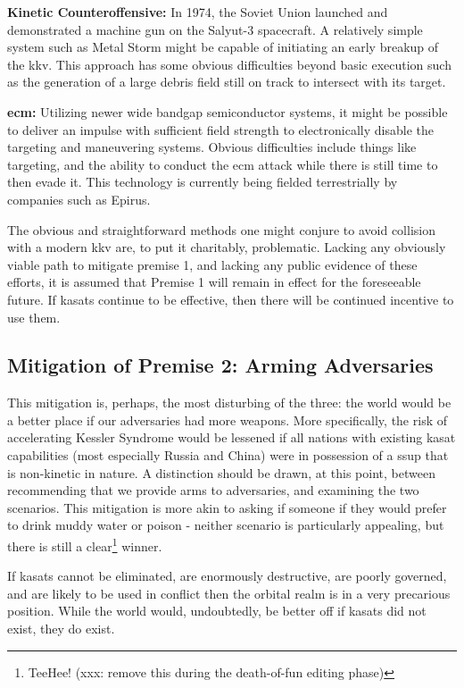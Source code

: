 \textbf{Kinetic Counteroffensive:} In 1974, the Soviet Union launched
and demonstrated a machine gun on the Salyut-3 spacecraft.\cite{xxx} A
relatively simple system such as Metal Storm might be capable of
initiating an early breakup of the \ac{kkv}.  This approach has some
obvious difficulties beyond basic execution such as the generation of
a large debris field still on track to intersect with its target.

\textbf{\acf{ecm}:} Utilizing newer wide bandgap semiconductor
systems, it might be possible to deliver an impulse with sufficient
field strength to electronically disable the  targeting and
maneuvering systems.  Obvious difficulties include things like
targeting, and the ability to conduct the \ac{ecm} attack while there
is still time to then evade it.  This technology is currently being
fielded terrestrially by companies such as Epirus.\cite{epirus}

The obvious and straightforward methods one might conjure to avoid
collision with a modern \ac{kkv} are, to put it charitably,
problematic.  Lacking any obviously viable path to mitigate premise 1,
and lacking any public evidence of these efforts, it is assumed that
Premise 1 will remain in effect for the foreseeable future.  If
\acp{kasat} continue to be effective, then there will be continued
incentive to use them.

\subsection{Mitigation of Premise 2: Arming Adversaries}
This mitigation is, perhaps, the most disturbing of the three: the
world would be a better place if our adversaries had more weapons.
More specifically, the risk of accelerating Kessler Syndrome would be
lessened if all nations with existing \ac{kasat} capabilities (most
especially Russia and China) were in possession of a \acf{ssup} that
is non-kinetic in nature.  A distinction should be drawn, at this
point, between recommending that we provide arms to adversaries, and
examining the two scenarios.  This mitigation is more akin to asking
if someone if they would prefer to drink muddy water or poison -
neither scenario is particularly appealing, but there is still a
clear\footnote{TeeHee! (xxx: remove this during the death-of-fun
editing phase)} winner.

If \acp{kasat} cannot be eliminated, are enormously destructive, are
poorly governed, and are likely to be used in conflict then the
orbital realm is in a very precarious position.  While the world
would, undoubtedly, be better off if \acp{kasat} did not exist, they
do exist.

